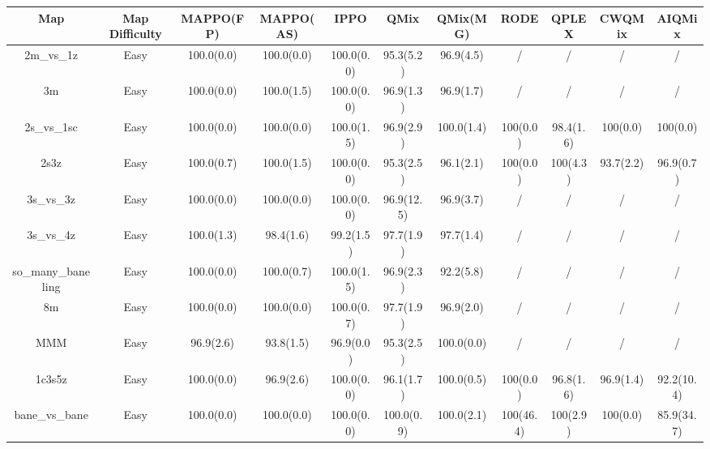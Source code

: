 \addtolength{\tabcolsep}{-4pt}    
\begin{table}
\centering
\vspace{-1mm}
\captionsetup{justification=centering}
\begin{tabular}{ccccccccccc}
\toprule
             Map & Map Difficulty &  MAPPO(FP) &  MAPPO(AS) &       IPPO &       QMix &   QMix(MG) &        RODE &      QPLEX &     CWQMix &     AIQMix \\
\midrule
        2m\_vs\_1z &           Easy & 100.0(0.0) & 100.0(0.0) & 100.0(0.0) &  95.3(5.2) &  96.9(4.5) &           / &          / &          / &          / \\
              3m &           Easy & 100.0(0.0) & 100.0(1.5) & 100.0(0.0) &  96.9(1.3) &  96.9(1.7) &           / &          / &          / &          / \\
       2s\_vs\_1sc &           Easy & 100.0(0.0) & 100.0(0.0) & 100.0(1.5) &  96.9(2.9) & 100.0(1.4) &    100(0.0) &  98.4(1.6) &   100(0.0) &   100(0.0) \\
            2s3z &           Easy & 100.0(0.7) & 100.0(1.5) & 100.0(0.0) &  95.3(2.5) &  96.1(2.1) &    100(0.0) &   100(4.3) &  93.7(2.2) &  96.9(0.7) \\
        3s\_vs\_3z &           Easy & 100.0(0.0) & 100.0(0.0) & 100.0(0.0) & 96.9(12.5) &  96.9(3.7) &           / &          / &          / &          / \\
        3s\_vs\_4z &           Easy & 100.0(1.3) &  98.4(1.6) &  99.2(1.5) &  97.7(1.9) &  97.7(1.4) &           / &          / &          / &          / \\
so\_many\_baneling &           Easy & 100.0(0.0) & 100.0(0.7) & 100.0(1.5) &  96.9(2.3) &  92.2(5.8) &           / &          / &          / &          / \\
              8m &           Easy & 100.0(0.0) & 100.0(0.0) & 100.0(0.7) &  97.7(1.9) &  96.9(2.0) &           / &          / &          / &          / \\
             MMM &           Easy &  96.9(2.6) &  93.8(1.5) &  96.9(0.0) &  95.3(2.5) & 100.0(0.0) &           / &          / &          / &          / \\
          1c3s5z &           Easy & 100.0(0.0) &  96.9(2.6) & 100.0(0.0) &  96.1(1.7) & 100.0(0.5) &    100(0.0) &  96.8(1.6) &  96.9(1.4) & 92.2(10.4) \\
    bane\_vs\_bane &           Easy & 100.0(0.0) & 100.0(0.0) & 100.0(0.0) & 100.0(0.9) & 100.0(2.1) &   100(46.4) &   100(2.9) &   100(0.0) & 85.9(34.7) \\

\end{tabular}
\end{table}
